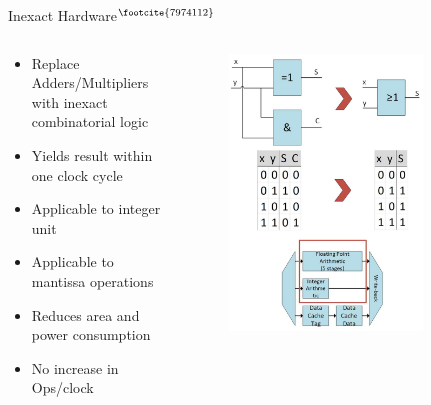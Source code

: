 \documentclass{beamer}
\begin{document}
\begin{frame}{Inexact Hardware$^{\text{\footcite{7974112}}}$}
\begin {columns}
 \begin{column}{0.5\textwidth}
 
    \begin{itemize}
        \item<1->Replace Adders/Multipliers with inexact combinatorial logic
        \item<2->Yields result within one clock cycle
        \item<3->Applicable to integer unit 
        \item<4->Applicable to mantissa operations
        \item<5->Reduces area and power consumption
        \item<6->No increase in Ops/clock
    \end{itemize}
    
 \end{column}
  \begin{column}{0.5\textwidth}
    \begin{figure}
     \includegraphics[width=0.8\textwidth]{img/inaccurateHardware.jpg}
    \end{figure}
  \end{column}
\end {columns}
\end{frame}
\end{document}
